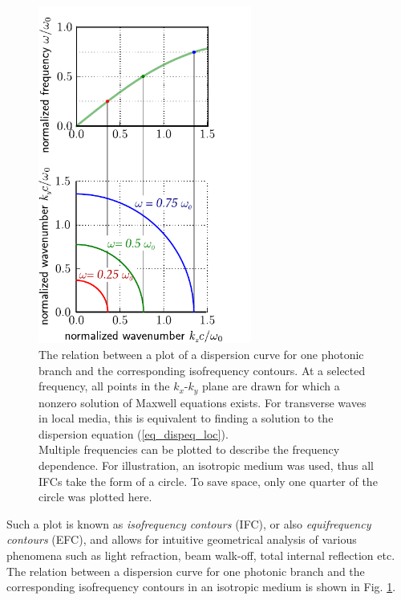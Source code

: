\begin{figure}
  \begin{minipage}[c]{0.5\textwidth}
\hfill
    \includegraphics[width=7cm]{img/dispersion_curves_to_ifc.pdf}
  \end{minipage}
  \begin{minipage}[c]{0.5\textwidth}
    \caption{The relation between a plot of a dispersion curve for one photonic branch and the corresponding isofrequency contours. At a selected frequency, all points in the $k_x$-$k_y$ plane are drawn for which a nonzero solution of Maxwell equations exists. For transverse waves in local media, this is equivalent to finding a solution to the dispersion equation (\ref{eq_dispeq_loc}).\\Multiple frequencies can be plotted to describe the frequency dependence. For illustration, an isotropic medium was used, thus all IFCs take the form of a circle. To save space, only one quarter of the circle was plotted here.} \label{fg_ifc_dc}
  \end{minipage}
\end{figure}

Such a plot is known as \textit{isofrequency contours} (IFC), or also \textit{equifrequency contours} (EFC), and allows for intuitive geometrical analysis of various phenomena such as light refraction, beam walk-off, total internal reflection etc. 
The relation between a dispersion curve for one photonic branch and the corresponding isofrequency contours in an isotropic medium is shown in Fig. \ref{fg_ifc_dc}.

